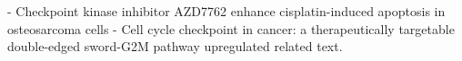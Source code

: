 - Checkpoint kinase inhibitor AZD7762 enhance cisplatin-induced apoptosis in osteosarcoma cells
- Cell cycle checkpoint in cancer: a therapeutically targetable double-edged sword-G2M pathway upregulated related text.






 


